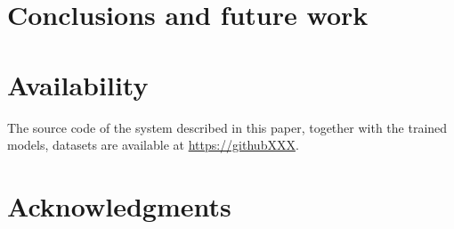 \documentclass[10pt, a4paper]{article}
\begin{document}
\section{Conclusions and future work}


\section{Availability}

The source code of the system described in this paper, together with the trained models, datasets are available at \url{https://githubXXX}.


\section{Acknowledgments}


 
\end{document}
